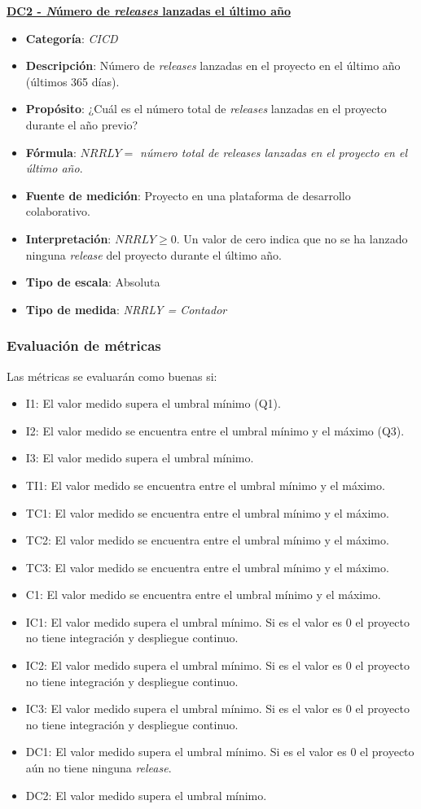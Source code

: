 \textbf{\underline{DC2 - \textit Número de \textit{releases} lanzadas el último año}}
\begin{itemize}
	\item \textbf{Categoría}: \textit{CICD}
	\item \textbf{Descripción}: Número de \textit{releases} lanzadas en el proyecto en el último año (últimos 365 días).
	\item \textbf{Propósito}: ¿Cuál es el número total de \textit{releases} lanzadas en el proyecto durante el año previo?
	\item \textbf{Fórmula}: $NRRLY =$ \textit{número total de releases lanzadas en el proyecto en el último año}.
	\item \textbf{Fuente de medición}: Proyecto en una plataforma de desarrollo colaborativo.
	\item \textbf{Interpretación}: $NRRLY \geq 0$. Un valor de cero indica que no se ha lanzado ninguna \textit{release} del proyecto durante el último año.
	\item \textbf{Tipo de escala}: Absoluta
	\item \textbf{Tipo de medida}: \textit{NRRLY = Contador}
\end{itemize}

\subsubsection{Evaluación de métricas}\label{sect:B_5_1_2}
Las métricas se evaluarán como buenas si:
\begin{itemize}
	\item I1: El valor medido supera el umbral mínimo (Q1).
	\item I2: El valor medido se encuentra entre el umbral mínimo y el máximo (Q3).
	\item I3: El valor medido supera el umbral mínimo.
	\item TI1: El valor medido se encuentra entre el umbral mínimo y el máximo.
	\item TC1: El valor medido se encuentra entre el umbral mínimo y el máximo.
	\item TC2: El valor medido se encuentra entre el umbral mínimo y el máximo.
	\item TC3: El valor medido se encuentra entre el umbral mínimo y el máximo.
	\item C1: El valor medido se encuentra entre el umbral mínimo y el máximo.
	\item IC1: El valor medido supera el umbral mínimo. Si es el valor es 0 el proyecto no tiene integración y despliegue continuo.
	\item IC2: El valor medido supera el umbral mínimo. Si es el valor es 0 el proyecto no tiene integración y despliegue continuo.
	\item IC3: El valor medido supera el umbral mínimo. Si es el valor es 0 el proyecto no tiene integración y despliegue continuo.
	\item DC1: El valor medido supera el umbral mínimo. Si es el valor es 0 el proyecto aún no tiene ninguna \textit{release}.
	\item DC2: El valor medido supera el umbral mínimo.
\end{itemize}

